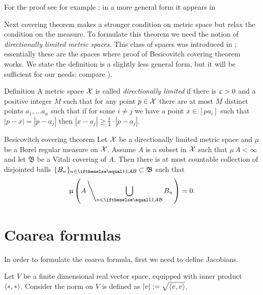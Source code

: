 For the proof see for example \cite[Theorem 1.6]{heinonen};
in a more general form it appears in \cite[Section 2.8]{federer}

Next covering theorem makes a stronger condition on metric space
but relax the condition on the measure.
To formulate this theorem we need 
the notion of \emph{directionally limited metric spaces}.
This class of spaces was introduced in \cite[2.8.9]{federer};
essentially these are the spaces where proof of Besicovitch covering theorem
works.
We state the definition is a slightly less general form, but it will be sufficient for our needs;
compare \cite[page 7]{heinonen}).

\begin{thm}{Definition}\label{def:directionally-limited}
A metric space $\mathcal{X}$
is called \emph{directionally limited}
if there is $\upvarepsilon>0$ and a positive integer $M$
such that for any point $p\in \spc{X}$
there are at most $M$ distinct points $a_1,\dots a_n$
such that if for some $i\ne j$ we have a point $x\in [pa_i]$ such that $|p-x|=|p-a_j|$
then $|x-a_j|\ge\tfrac14\cdot|p-a_j|$.
\end{thm}



\begin{thm}{Besicovitch covering theorem}
Let $\mathcal{X}$ be a directionally limited metric space 
and $\mu$ be a Borel regular measure on $\mathcal{X}$.
Assume $A$ is a subset in $\mathcal{X}$ such that $\mu\, A<\infty$
and let $\mathfrak{B}$ be a Vitali covering of $A$.
Then there is at most countable collection of disjointed balls 
$\{B_n\}_{n\in\IndexSet}\subset\mathfrak{B}$ such that
$$\mu\left(A\left\backslash\bigcup_{n\in\IndexSet}B_n\right.\right)=0.$$

\end{thm}

\section{Coarea formulas}\label{sec:coarea-prelim}

In order to formulate the coarea formula,
first we need to define Jacobians.


Let $V$ be a finite dimensional real vector space, equipped with inner product $\langle{*},{*}\rangle$.
Consider the norm on $V$ is defined as $|v|:=\sqrt{\langle v,v\rangle}$.


